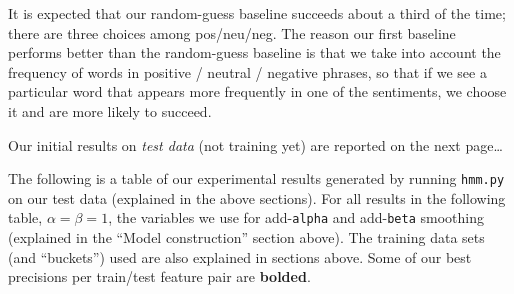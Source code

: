 \documentclass{article}
\begin{document}
It is expected that our random-guess baseline succeeds about a third of the time; there are three choices among pos/neu/neg. The reason our first baseline performs better than the random-guess baseline is that we take into account the frequency of words in positive / neutral / negative phrases, so that if we see a particular word that appears more frequently in one of the sentiments, we choose it and are more likely to succeed.

\par\bigskip
Our initial results on \emph{test data} (not training yet) are reported on the next page\ldots

\newpage
The following is a table of our experimental results generated by running \texttt{hmm.py} on our test data (explained in the above sections). For all results in the following table, $\alpha = \beta = 1$, the variables we use for add-\texttt{alpha} and add-\texttt{beta} smoothing (explained in the ``Model construction'' section above). The training data sets (and ``buckets'') used are also explained in sections above. Some of our best precisions per train/test feature pair are \textbf{bolded}.\par\bigskip
\end{document}
